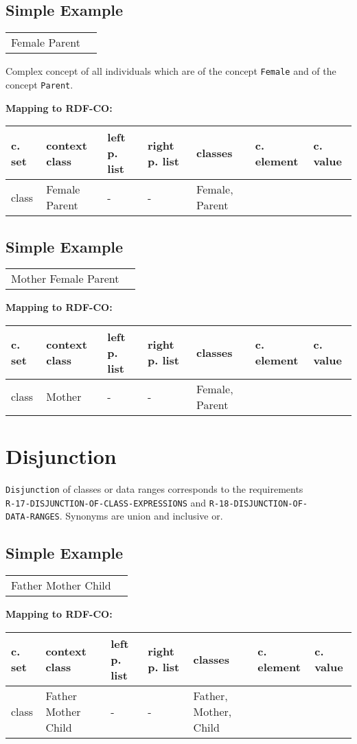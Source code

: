 \documentclass{llncs}
\newcommand{\ms}[1]{\texttt{#1}}
\newenvironment{gcotable}{
  \scriptsize
  \sffamily
  \vspace{0cm}
	\begin{center}
	\textbf{\vspace{0.4cm}Mapping to RDF-CO:} \\
  \begin{tabular}{l|l|l|l|l|l|l}
	\hline
  \textbf{c. set} & \textbf{context class} & \textbf{left p. list} & \textbf{right p. list} & \textbf{classes} & \textbf{c. element} & \textbf{c. value} \\
  \hline

}{
  \hline
  \end{tabular}
	\end{center}
}
\newenvironment{DL}{
\vspace{0cm}
	\begin{center}
  \begin{tabular}{r l}

}{
  \end{tabular}
	\end{center}
}
\begin{document}
\subsection{Simple Example}

\begin{DL}
Female  Parent
\end{DL}

Complex concept of all individuals which are of the concept \ms{Female} and of the concept \ms{Parent}.

\begin{gcotable}
class & Female  Parent & - & - & Female, Parent &  \\
\end{gcotable}

\subsection{Simple Example}

\begin{DL}
Mother  Female  Parent
\end{DL}

\begin{gcotable}
class & Mother & - & - & Female, Parent &  \\
\end{gcotable}

\section{Disjunction}

\ms{Disjunction} of classes or data ranges corresponds to the requirements \\
\ms{R-17-DISJUNCTION-OF-CLASS-EXPRESSIONS} and \ms{R-18-DISJUNCTION-OF-} \\
\ms{DATA-RANGES}.
Synonyms are union and inclusive or.

\subsection{Simple Example}

\begin{DL}
Father  Mother  Child
\end{DL}

\begin{gcotable}
class & Father  Mother  Child & - & - & Father, Mother, Child &  \\
\end{gcotable}
\end{document}
